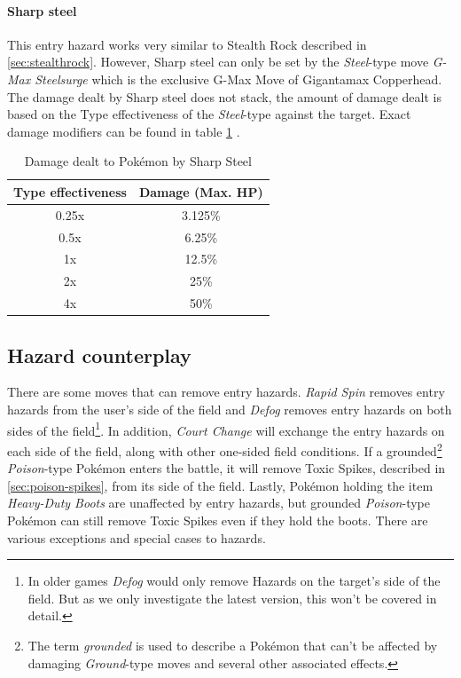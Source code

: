 \paragraph{Sharp steel}
This entry hazard works very similar to Stealth Rock described in \ref{sec:stealthrock}.
However, Sharp steel can only be set by the \textit{Steel}-type move
\textit{G-Max Steelsurge} which is the exclusive G-Max Move of Gigantamax Copperhead.
The damage dealt by Sharp steel does not stack, the amount of damage dealt is
based on the Type effectiveness of the \textit{Steel}-type against the target.
Exact damage modifiers can be found in table \ref{tab:sharp-steel-damage}
\cite{Bulbapedia:GMaxSteelsurge}.
\begin{table}[h]
	\label{tab:sharp-steel-damage}
	\centering
	\begin{tabular}{|c|c|}
		\hline
		\textbf{Type effectiveness} & \textbf{Damage (Max. \ac{HP}}) \\
		\hline 
		0.25x & 3.125\% \\ 
		\hline 
		0.5x &  6.25\% \\ 
		\hline 
		1x & 12.5\% \\
		\hline
		2x & 25\% \\
		\hline
		4x & 50\% \\
		\hline
	\end{tabular} 
	\caption{Damage dealt to Pokémon by Sharp Steel\cite{Bulbapedia:GMaxSteelsurge}}
\end{table}

\subsection{Hazard counterplay}
There are some moves that can remove entry hazards. \textit{Rapid Spin} 
\cite{Bulbapedia:RapidSpin} removes entry hazards from the user's side of the field and
\textit{Defog}\cite{Bulbapedia:Defog} removes entry hazards on both sides of the 
field\footnote{In older games \textit{Defog} would only remove Hazards on the
target's side of the field. But as we only investigate the latest version, this
won't be covered in detail.}. In addition, 
\textit{Court Change}\cite{Bulbapedia:CourtChange} will exchange the entry hazards
on each side of the field, along with other one-sided field conditions.
If a grounded\footnote{The term \textit{grounded} is used to describe a Pokémon that
can't be affected by damaging \textit{Ground}-type moves and several other associated 
effects\cite{Bulbapedia:Grounded}.}
\textit{Poison}-type Pokémon enters the battle, it will remove Toxic 
Spikes, described in \ref{sec:poison-spikes}, from its side of the field.
Lastly, Pokémon holding the item 
\textit{Heavy-Duty Boots}\cite{Bulbapedia:HeavyDutyBoots} are unaffected by
entry hazards, but grounded \textit{Poison}-type Pokémon can still remove
Toxic Spikes even if they hold the boots\cite{Bulbapedia:EntryHazards}.
There are various exceptions and special cases to hazards. 

